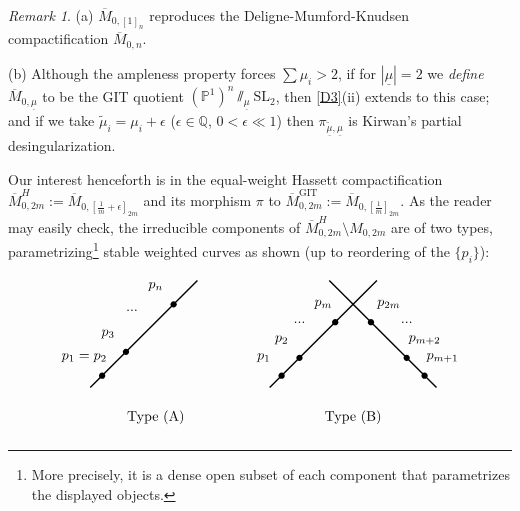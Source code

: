 \documentclass[12pt,letterpaper,english]{amsart}
\numberwithin{equation}{section}
\numberwithin{figure}{section}
\theoremstyle{plain}
\theoremstyle{remark}
\newtheorem{rem}[equation]{Remark}
\theoremstyle{definition}
\theoremstyle{definition}
\theoremstyle{plain}
\theoremstyle{plain}
\theoremstyle{plain}
\theoremstyle{plain}
\theoremstyle{definition}
\def\QQ{\mathbb{Q}}
\def\PP{\mathbb{P}}
\def\sm{\setminus}
\theoremstyle{definition}
\begin{document}
\begin{rem}\label{D4}
(a) $\overline{M}_{0,[1]_n}$ reproduces the Deligne-Mumford-Knudsen compactification $\overline{M}_{0,n}$.

(b)	 Although the ampleness property forces $\sum\mu_i>2$, if for $|\underline{\mu}|=2$ we \emph{define} $\overline{M}_{0,\underline{\mu}}$ to be the GIT quotient $(\PP^1)^n\sslash_{\underline{\mu}}\mathrm{SL}_2$, then \eqref{D3}(ii) extends to this case; and if we take $\tilde{\mu}_i=\mu_i+\epsilon$ ($\epsilon\in \QQ$, $0<\epsilon\ll 1$) then $\pi_{\tilde{\underline{\mu}},\underline{\mu}}$ is Kirwan's partial desingularization.
\end{rem}

Our interest henceforth is in the equal-weight Hassett compactification $\overline{M}^H_{0,2m}:=\overline{M}_{0,[\frac{1}{m}+\epsilon]_{2m}}$ and its morphism $\pi$ to $\overline{M}^{\text{GIT}}_{0,2m}:=\overline{M}_{0,[\frac{1}{m}]_{2m}}$. As the reader may easily check, the irreducible components of $\overline{M}^H_{0,2m}\sm M_{0,2m}$ are of two types, parametrizing\footnote{More precisely, it is a dense open subset of each component that parametrizes the displayed objects.} stable weighted curves as shown (up to reordering of the $\{p_i\}$):

\begin{center}
\begin{equation*}
\begin{tikzpicture}[scale=3]
\draw[-,line width=1.0pt] (-0.5,-0.5) -- (0.4,0.4); 
\fill (-0.4,-0.4) circle (0.75pt);
\node at (-0.55,-0.25) {$p_1=p_2$};
\fill (-0.2,-0.2) circle (0.75pt);
\node at (-0.35,-0.05) {$p_3$};
\node at (-0.15,0.15) {$...$};
\node at (0.05,0.35) {$p_n$};
\fill (0.2,0.2) circle (0.75pt);
\node at (0.05, -0.75) {Type (A)};
\end{tikzpicture}
\mspace{70mu}
\begin{tikzpicture}[scale=3]
\draw[-,line width=1.0pt] (-0.5,-0.5) -- (0.4,0.4);
\draw[-,line width=1.0pt] (0.9,-0.5) -- (0,0.4);
\fill (-0.4,-0.4) circle (0.75pt);
\node at (-0.55,-0.25) {$p_1$};
\fill (-0.25,-0.25) circle (0.75pt);
\node at (-0.4,-0.1) {$p_2$};
\node at (-0.25,0.05) {$...$};
\node at (-0.05,0.2) {$p_m$};
\fill (0.05,0.05) circle (0.75pt);
\fill (0.8,-0.4) circle (0.75pt);
\node at (0.95,-0.25) {$p_{m+1}$};
\fill (0.65,-0.25) circle (0.75pt);
\node at (0.8,-0.1) {$p_{m+2}$};
\node at (0.65,0.05) {$...$};
\node at (0.5,0.2) {$p_{2m}$};
\fill (0.35,0.05) circle (0.75pt);
\node at (0.2,-0.75) {Type (B)};
\end{tikzpicture}
\end{equation*}
\end{center}
\end{document}
